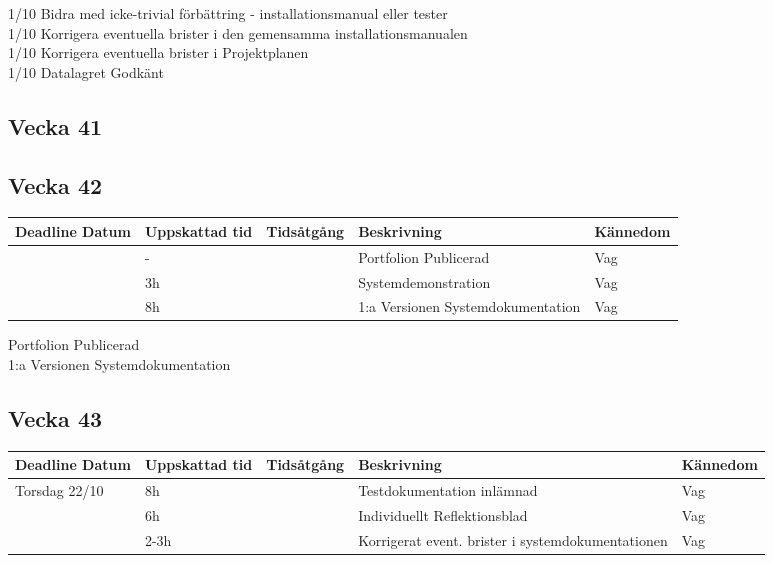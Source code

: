 \documentclass{TDP003mall}
\begin{document}
1/10 Bidra med icke-trivial förbättring - installationsmanual eller tester\\
1/10 Korrigera eventuella brister i den gemensamma installationsmanualen\\
1/10 Korrigera eventuella brister i Projektplanen\\
1/10 Datalagret Godkänt\\

\subsection{Vecka 41}


\subsection{Vecka 42}
\begin{tabularx}{\linewidth}{|l|l|l|X|l|}
	\hline
	Deadline Datum & Uppskattad tid & Tidsåtgång & Beskrivning                       & Kännedom \\ [0.5ex]
	\hline
                   & -              &            & Portfolion Publicerad             & Vag      \\
	\hline
                   & 3h             &            & Systemdemonstration               & Vag      \\
	\hline
                   & 8h             &            & 1:a Versionen Systemdokumentation & Vag      \\
	\hline
\end{tabularx}

Portfolion Publicerad\\
1:a Versionen Systemdokumentation\\

\subsection{Vecka 43}
\begin{tabularx}{\linewidth}{|l|l|l|X|l|}
	\hline
	Deadline Datum & Uppskattad tid & Tidsåtgång & Beskrivning                                       & Kännedom \\ [0.5ex]
	\hline
	Torsdag 22/10  & 8h             &            & Testdokumentation inlämnad                        & Vag      \\
	\hline
                   & 6h             &            & Individuellt Reflektionsblad                      & Vag      \\
	\hline
                   & 2-3h           &            & Korrigerat event. brister i systemdokumentationen & Vag      \\
	\hline
\end{tabularx}
\end{document}
